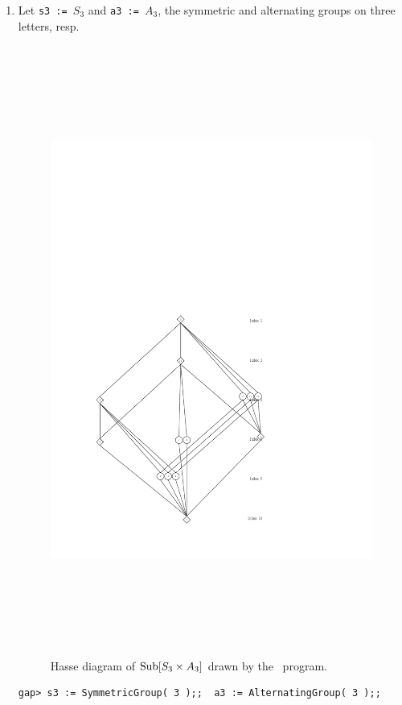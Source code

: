 \begin{enumerate}
\item 
Let 
{\tt s3 := $S_3$} and {\tt a3 := $A_3$}, 
the symmetric and alternating groups on three letters, resp.
\begin{figure}[!ht]\begin{center}
\vspace{-8cm}
\includegraphics[height=20cm]{s3a3new.pdf}%
\caption{Hasse diagram of $\operatorname{Sub}[S_3 \times A_3]$ drawn by the \xgap\ program.}
\label{fig:s3a3}
\end{center}\end{figure}
{\codesize
\begin{verbatim}
gap> s3 := SymmetricGroup( 3 );;  a3 := AlternatingGroup( 3 );;


\end{verbatim}}
\end{enumerate}
